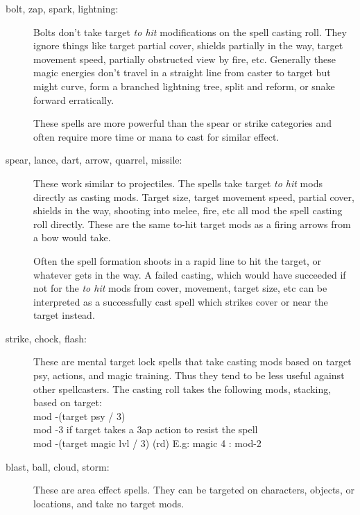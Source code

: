 \begin{description}

\item[bolt, zap, spark, lightning:]
Bolts don't take target \emph{to hit} modifications on the spell casting roll. They ignore things like target partial cover, shields partially in the way, target movement speed, partially obstructed view by fire, etc.
Generally these magic energies don't travel in a straight line from caster to target but might curve, form a branched lightning tree, split and reform, or snake forward erratically.

These spells are more powerful than the spear or strike categories and often require more time or mana to cast for similar effect.


\item[spear, lance, dart, arrow, quarrel, missile:]
These work similar to projectiles. The spells take target \emph{to hit} mods directly as casting mods. Target size, target movement speed, partial cover, shields in the way, shooting into melee, fire, etc all mod the spell casting roll directly. These are the same to-hit target mods as a firing arrows from a bow would take. 


Often the spell formation shoots in a rapid line to hit the target, or whatever gets in the way. A failed casting, which would have succeeded if not for the \emph{to hit} mods from cover, movement, target size, etc can be interpreted as a successfully cast spell which strikes cover or near the target instead.



\item[strike, chock, flash:] 
These are mental target lock spells that take casting mods based on target psy, actions, and magic training. Thus they tend to be less useful against other spellcasters. The casting roll takes the following mods, stacking, based on target:\\
mod -(target psy / 3)\\
mod -3 if target takes a 3ap action to resist the spell\\
mod -(target magic lvl / 3) (rd) E.g: magic 4 : mod-2


\item[blast, ball, cloud, storm:]
These are area effect spells. They can be targeted on characters, objects, or locations, and take no target mods.


\end{description}


